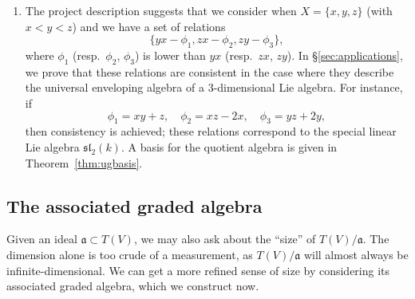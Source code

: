 \begin{enumerate}
    \item The project description suggests that we consider when $X = \{x,y,z\}$ (with $x<y<z$) and we have a set of relations
\begin{equation*}
\{yx-\phi_1,zx-\phi_2,zy-\phi_3\},
\end{equation*}
where $\phi_1$ (resp.\ $\phi_2$, $\phi_3$) is lower than $yx$ (resp.\ $zx$, $zy$). In \S\ref{sec:applications}, we prove that these relations are consistent in the case where they describe the universal enveloping algebra of a $3$-dimensional Lie algebra. For instance, if
\begin{equation*}
\phi_1=xy+z,\quad\phi_2=xz-2x,\quad\phi_3=yz+2y,
\end{equation*}
then consistency is achieved; these relations correspond to the special linear Lie algebra $\mathfrak{sl}_2(k)$. A basis for the quotient algebra is given in Theorem~\ref{thm:ugbasis}.
\end{enumerate}

\subsection{The associated graded algebra}\label{sec:assoc-graded}
Given an ideal $\mathfrak{a} \subset T(V)$, we may also ask about the ``size'' of $T(V)/\mathfrak{a}$. The dimension alone is too crude of a measurement, as $T(V)/\mathfrak{a}$ will almost always be infinite-dimensional. We can get a more refined sense of size by considering its associated graded algebra, which we construct now.


